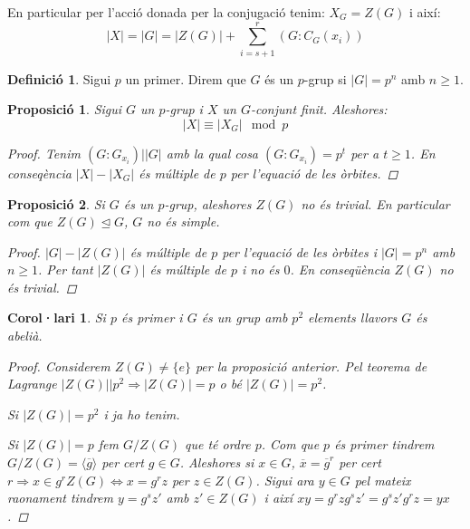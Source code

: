 \documentclass[a4paper,11pt]{report}
\newcommand{\ordre}[1]{|#1|}
\renewcommand{\bar}{\overline}
\renewcommand{\implies}{\Leftrightarrow}
\theoremstyle{theorem}
\newtheorem{proposicio}{\normalfont \sffamily\bfseries Proposició}[section]
\newtheorem{col}{\normalfont \sffamily\bfseries Corol·lari}[section]
\theoremstyle{definition}
\newtheorem{definicio}{\normalfont\sffamily\bfseries Definició}[section]
\begin{document}
En particular per l'acció donada per la conjugació tenim:
$X_G=Z(G)$ i així:
$$|X|=|G|=|Z(G)|+\sum_{i=s+1}^{r}(G:C_G(x_i))$$
\begin{definicio}
	Sigui $p$ un primer. Direm que $G$ és un $p$-grup si $|G|=p^n$ amb $n\geq 1$.
\end{definicio}
\begin{proposicio}
	Sigui $G$ un $p$-grup i $X$ un $G$-conjunt finit. Aleshores:$$|X|\equiv|X_G|\mod p$$
	\begin{proof}
 		Tenim $(G : G_{x_i}) \big| |G|$ amb la qual cosa $(G:G_{x_i})=p^t$ per a $t\geq 1$. En conseqència $|X|-|X_G|$ és múltiple de $p$ per l'equació de les òrbites.
	\end{proof}
\end{proposicio}
\begin{proposicio}
	Si $G$ és un $p$-grup, aleshores $Z(G)$ no és trivial. En particular com que $Z(G)\unlhd G$, $G$ no és simple.
	\begin{proof}
		$|G|-|Z(G)|$ és múltiple de $p$ per l'equació de les òrbites i $|G|=p^n$ amb $n\geq 1$. Per tant $|Z(G)|$ és múltiple de $p$ i no és $0$. En conseqüència $Z(G)$ no és trivial.
	\end{proof}
\end{proposicio}
\begin{col}
	Si $p$ és primer i $G$ és un grup amb $p^2$ elements llavors $G$ és abelià.
	\begin{proof}
		Considerem $Z(G)\ne \{e\}$ per la proposició anterior. Pel teorema de Lagrange $|Z(G)|\big| p^2\Rightarrow \ordre{Z(G)}=p$ o bé $\ordre{Z(G)}=p^2$.
		
			Si $\ordre{Z(G)}=p^2$ i ja ho tenim.
			
			Si $\ordre{Z(G)}=p$ fem $G/Z(G)$ que té ordre $p$. Com que $p$ és primer tindrem $G/Z(G)=\langle\bar{g}\rangle$ per cert $g\in G$. Aleshores si $x\in G$, $\bar{x}=\bar{g}^r$ per cert $r\Rightarrow x\in g^r Z(G)\implies x=g^r z$ per $z\in Z(G)$. Sigui ara $y\in G$ pel mateix raonament tindrem $y=g^sz'$ amb $z'\in Z(G)$ i així $xy=g^rzg^s z'=g^sz'g^rz=yx$.
	
\end{proof}
\end{col}
\end{document}

